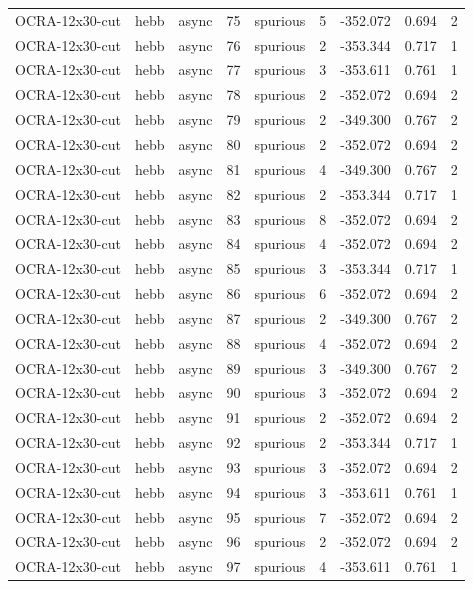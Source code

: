 \begin{tabular}{lllrlrrrr}
OCRA-12x30-cut & hebb & async & 75 & spurious & 5 & -352.072 & 0.694 & 2 \\
OCRA-12x30-cut & hebb & async & 76 & spurious & 2 & -353.344 & 0.717 & 1 \\
OCRA-12x30-cut & hebb & async & 77 & spurious & 3 & -353.611 & 0.761 & 1 \\
OCRA-12x30-cut & hebb & async & 78 & spurious & 2 & -352.072 & 0.694 & 2 \\
OCRA-12x30-cut & hebb & async & 79 & spurious & 2 & -349.300 & 0.767 & 2 \\
OCRA-12x30-cut & hebb & async & 80 & spurious & 2 & -352.072 & 0.694 & 2 \\
OCRA-12x30-cut & hebb & async & 81 & spurious & 4 & -349.300 & 0.767 & 2 \\
OCRA-12x30-cut & hebb & async & 82 & spurious & 2 & -353.344 & 0.717 & 1 \\
OCRA-12x30-cut & hebb & async & 83 & spurious & 8 & -352.072 & 0.694 & 2 \\
OCRA-12x30-cut & hebb & async & 84 & spurious & 4 & -352.072 & 0.694 & 2 \\
OCRA-12x30-cut & hebb & async & 85 & spurious & 3 & -353.344 & 0.717 & 1 \\
OCRA-12x30-cut & hebb & async & 86 & spurious & 6 & -352.072 & 0.694 & 2 \\
OCRA-12x30-cut & hebb & async & 87 & spurious & 2 & -349.300 & 0.767 & 2 \\
OCRA-12x30-cut & hebb & async & 88 & spurious & 4 & -352.072 & 0.694 & 2 \\
OCRA-12x30-cut & hebb & async & 89 & spurious & 3 & -349.300 & 0.767 & 2 \\
OCRA-12x30-cut & hebb & async & 90 & spurious & 3 & -352.072 & 0.694 & 2 \\
OCRA-12x30-cut & hebb & async & 91 & spurious & 2 & -352.072 & 0.694 & 2 \\
OCRA-12x30-cut & hebb & async & 92 & spurious & 2 & -353.344 & 0.717 & 1 \\
OCRA-12x30-cut & hebb & async & 93 & spurious & 3 & -352.072 & 0.694 & 2 \\
OCRA-12x30-cut & hebb & async & 94 & spurious & 3 & -353.611 & 0.761 & 1 \\
OCRA-12x30-cut & hebb & async & 95 & spurious & 7 & -352.072 & 0.694 & 2 \\
OCRA-12x30-cut & hebb & async & 96 & spurious & 2 & -352.072 & 0.694 & 2 \\
OCRA-12x30-cut & hebb & async & 97 & spurious & 4 & -353.611 & 0.761 & 1 \\

\end{tabular}
